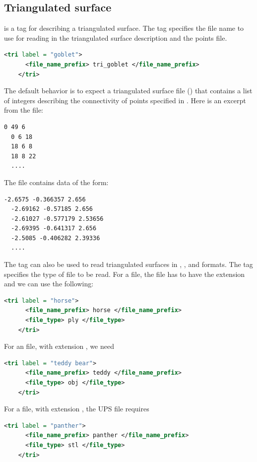 \subsection{Triangulated surface}
\begin{minipage}{0.7\textwidth}
   is a tag for describing a triangulated surface.
  The  tag specifies the file name to use for reading in the
  triangulated surface description and the points file.  
  \begin{lstlisting}[language=XML]
    <tri label = "goblet">
      <file_name_prefix> tri_goblet </file_name_prefix>
    </tri>
  \end{lstlisting}
  The default behavior is to expect a triangulated surface file () 
  that contains a list of integers
  describing the connectivity of points specified in .
  Here is an excerpt from the  file:
  \begin{lstlisting}[backgroundcolor=\color{background}]
  0 49 6
  0 6 18
  18 6 8
  18 8 22
  ....
  \end{lstlisting}
  The  file contains data of the form:
  \begin{lstlisting}[backgroundcolor=\color{background}]
  -2.6575 -0.366357 2.656
  -2.69162 -0.57185 2.656
  -2.61027 -0.577179 2.53656
  -2.69395 -0.641317 2.656
  -2.5085 -0.406282 2.39336
  ....
  \end{lstlisting}
  The  tag can also be used to read triangulated surfaces in , 
  , and  formats.  The  tag specifies the 
  type of file to be read.  For a  file, the file has to have the 
  extension and we can use the following:
  \begin{lstlisting}[language=XML]
    <tri label = "horse">
      <file_name_prefix> horse </file_name_prefix>
      <file_type> ply </file_type>
    </tri>
  \end{lstlisting}
  For an  file, with extension , we need
  \begin{lstlisting}[language=XML]
    <tri label = "teddy bear">
      <file_name_prefix> teddy </file_name_prefix>
      <file_type> obj </file_type>
    </tri>
  \end{lstlisting}
  For a  file, with extension , the UPS file requires
  \begin{lstlisting}[language=XML]
    <tri label = "panther">
      <file_name_prefix> panther </file_name_prefix>
      <file_type> stl </file_type>
    </tri>
  \end{lstlisting}
\end{minipage}

